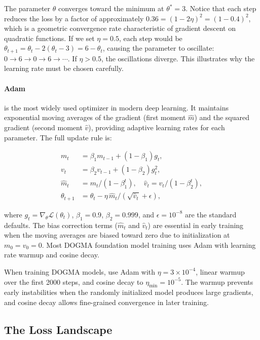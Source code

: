 The parameter $\theta$ converges toward the minimum at $\theta^* = 3$. Notice that each step reduces the loss by a factor of approximately $0.36 = (1 - 2\eta)^2 = (1 - 0.4)^2$, which is a geometric convergence rate characteristic of gradient descent on quadratic functions. If we set $\eta = 0.5$, each step would be $\theta_{t+1} = \theta_t - 2(\theta_t - 3) = 6 - \theta_t$, causing the parameter to oscillate: $0 \to 6 \to 0 \to 6 \to \cdots$. If $\eta > 0.5$, the oscillations diverge. This illustrates why the learning rate must be chosen carefully.

\paragraph{Adam} \citep{kingma2015} is the most widely used optimizer in modern deep learning. It maintains exponential moving averages of the gradient (first moment $\hat{m}$) and the squared gradient (second moment $\hat{v}$), providing adaptive learning rates for each parameter. The full update rule is:

\begin{align}
m_t &= \beta_1 m_{t-1} + (1 - \beta_1) g_t, \\
v_t &= \beta_2 v_{t-1} + (1 - \beta_2) g_t^2, \\
\hat{m}_t &= m_t / (1 - \beta_1^t), \quad \hat{v}_t = v_t / (1 - \beta_2^t), \\
\theta_{t+1} &= \theta_t - \eta \, \hat{m}_t / (\sqrt{\hat{v}_t} + \epsilon),
\end{align}

where $g_t = \nabla_\theta \mathcal{L}(\theta_t)$, $\beta_1 = 0.9$, $\beta_2 = 0.999$, and $\epsilon = 10^{-8}$ are the standard defaults. The bias correction terms ($\hat{m}_t$ and $\hat{v}_t$) are essential in early training when the moving averages are biased toward zero due to initialization at $m_0 = v_0 = 0$. Most DOGMA foundation model training uses Adam with learning rate warmup and cosine decay.

\begin{implnote}
When training DOGMA models, use Adam with $\eta = 3 \times 10^{-4}$, linear warmup over the first 2000 steps, and cosine decay to $\eta_{\min} = 10^{-5}$. The warmup prevents early instabilities when the randomly initialized model produces large gradients, and cosine decay allows fine-grained convergence in later training.
\end{implnote}

\subsection{The Loss Landscape}

